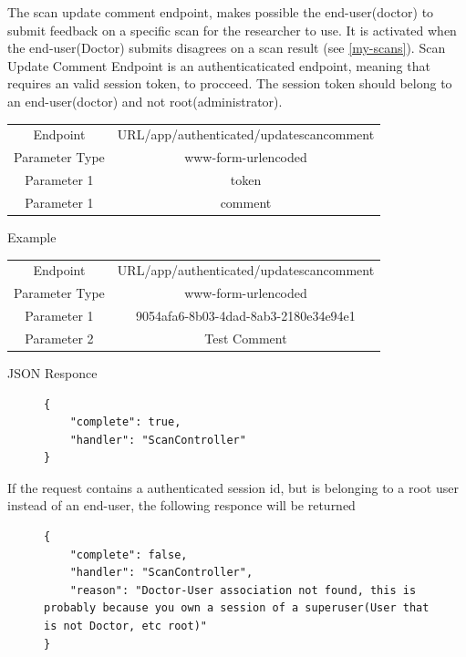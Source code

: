 					The scan update comment endpoint, makes possible the end-user(doctor) to submit feedback on a specific scan for the 
					researcher to use. It is activated when the end-user(Doctor) submits disagrees on a scan result (see \ref{my-scans}). 
					Scan Update Comment Endpoint is an authenticaticated endpoint, meaning that requires an valid session token, to procceed. 
					The session token should belong to an end-user(doctor) and not root(administrator).
					\begin{center}
						\begin{tabular}{ |c|c| } 
							\hline
							Endpoint & {{URL}}/app/authenticated/updatescancomment\\
							Parameter Type & www-form-urlencoded  \\
							Parameter 1 & token  \\
							Parameter 1 & comment  \\
							\hline
						\end{tabular}
					\end{center}
					Example
					\begin{center}
						\begin{tabular}{ |c|c| } 
							\hline
							Endpoint & {{URL}}/app/authenticated/updatescancomment\\
							Parameter Type & www-form-urlencoded  \\
							Parameter 1 & 9054afa6-8b03-4dad-8ab3-2180e34e94e1  \\
							Parameter 2 & Test Comment  \\
							\hline
						\end{tabular}
					\end{center}
					JSON Responce
					\begin{figure}[H]
						\iftrue
						\begin{lstlisting}[]
{
	"complete": true,
	"handler": "ScanController"
}
						\end{lstlisting}
					\end{figure}
					If the request contains a authenticated session id, but is belonging to a root user instead of an end-user, the
					following responce will be returned
					\begin{figure}[H]
						\iftrue
						\begin{lstlisting}[]
{	
	"complete": false,
	"handler": "ScanController",
	"reason": "Doctor-User association not found, this is probably because you own a session of a superuser(User that is not Doctor, etc root)"
}
						\end{lstlisting}
					\end{figure}
